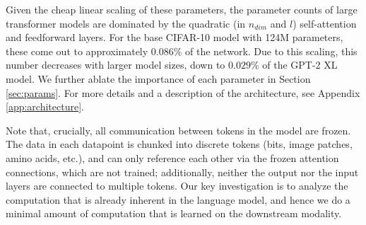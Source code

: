 Given the cheap linear scaling of these parameters, the parameter counts of large transformer models are dominated by the quadratic (in $n_{dim}$ and $l$) self-attention and feedforward layers.
For the base CIFAR-10 model with 124M parameters, these come out to approximately $0.086\%$ of the network.
Due to this scaling, this number decreases with larger model sizes, down to $0.029\%$ of the GPT-2 XL model.
We further ablate the importance of each parameter in Section \ref{sec:params}.
For more details and a description of the architecture, see Appendix \ref{app:architecture}.

Note that, crucially, all communication between tokens in the model are frozen.
The data in each datapoint is chunked into discrete tokens (bits, image patches, amino acids, etc.), and can only reference each other via the frozen attention connections, which are not trained; additionally, neither the output nor the input layers are connected to multiple tokens.
Our key investigation is to analyze the computation that is already inherent in the language model, and hence we do a minimal amount of computation that is learned on the downstream modality.
